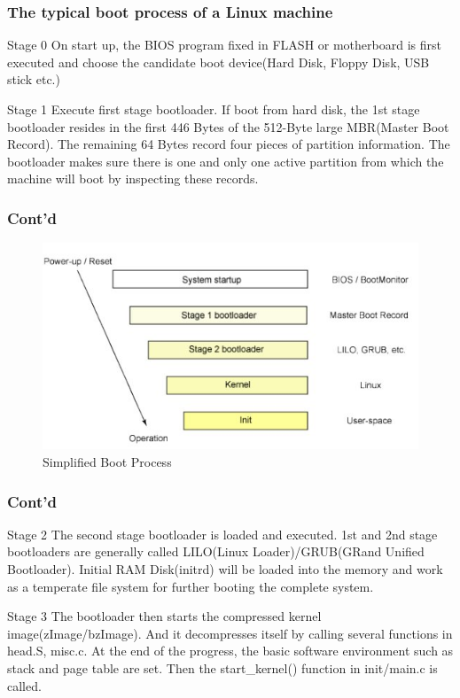 \documentclass{beamer}
\begin{document}
\begin{frame}
\frametitle{The typical boot process of a Linux machine}

\begin{block}{Stage 0}
On start up, the BIOS program fixed in FLASH or motherboard is first executed
and choose the candidate boot device(Hard Disk, Floppy Disk, USB stick etc.)
\end{block}
\begin{block}{Stage 1}
Execute first stage bootloader. If boot from hard disk, the 1st stage
bootloader resides in the first 446 Bytes of the 512-Byte large MBR(Master
Boot Record). The remaining 64 Bytes record four pieces of partition
information. The bootloader makes sure there is one and only one active
partition from which the machine will boot by inspecting these records.
\end{block}
\end{frame}
\begin{frame}
    \frametitle{Cont'd}
\begin{figure}[H]
    \begin{center}
	\includegraphics[scale=0.8]{back9.jpg}
    \end{center}
    \caption{Simplified Boot Process}
\end{figure}
\end{frame}

\begin{frame}
    \frametitle{Cont'd}
\begin{block}{Stage 2}
The second stage bootloader is loaded and executed. 1st and 2nd stage
bootloaders are generally called LILO(Linux Loader)/GRUB(GRand Unified
Bootloader). Initial RAM Disk(initrd) will be loaded into the memory and work
as a temperate file system for further booting the complete system.
\end{block}
\begin{block}{Stage 3}
The bootloader then starts the compressed kernel image(zImage/bzImage). And it
decompresses itself by calling several functions in head.S, misc.c. At the end
of the progress, the basic software environment such as stack and page table
are set. Then the start\_kernel() function in init/main.c is called. 
\end{block}
\end{frame}
\end{document}
